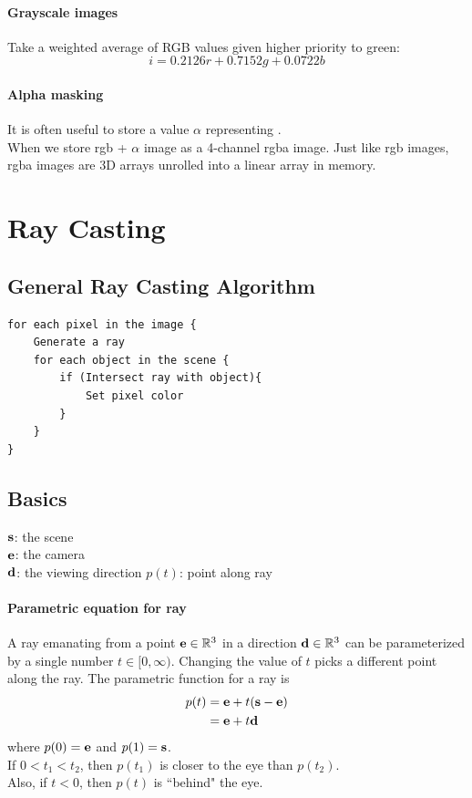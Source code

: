 \documentclass[11pt]{article}
\numberwithin{equation}{section}
\begin{document}
\paragraph{Grayscale images}
Take a weighted average of RGB values given higher priority to green:
\begin{equation}
	i = 0.2126r + 0.7152g + 0.0722b
\end{equation}


\paragraph{Alpha masking}
It is often useful to store a value $\alpha$ representing . \\
When we store rgb + $\alpha$ image as a 4-channel rgba image. Just like rgb images, rgba images are 3D arrays unrolled into a linear array in memory.

\section{Ray Casting}
\subsection{General Ray Casting Algorithm}
\begin{framed}
\begin{verbatim}
for each pixel in the image {
	Generate a ray
	for each object in the scene {
		if (Intersect ray with object){
			Set pixel color
		}
	}
}
\end{verbatim}
\end{framed}
\subsection{Basics}
\notation
$\textbf{s}$: the scene\\
$\textbf{e}$: the camera\\
$\textbf{d}$: the viewing direction
$p(t)$: point along ray
\paragraph{Parametric equation for ray}
A ray emanating from a point $\textbf{e} \in \mathbb{R}^3$ in a direction $\textbf{d} \in \mathbb{R}^3$ can be parameterized by a single number $t \in [0, \infty)$. Changing the value of $t$ picks a different point along the ray. The parametric function for a ray is
\begin{align}
	p(t) &= \textbf{e} + t(\textbf{s} - \textbf{e}) \\
	&= \textbf{e} + t\textbf{d}
\end{align}
where $p(0) = \textbf{e}$ and $p(1) = \textbf{s}$.\\
If $0 < t_1 < t_2$, then $p(t_1)$ is closer to the eye than $p(t_2)$.\\
Also, if $t < 0$, then $p(t)$ is ``behind" the eye.
\end{document}
